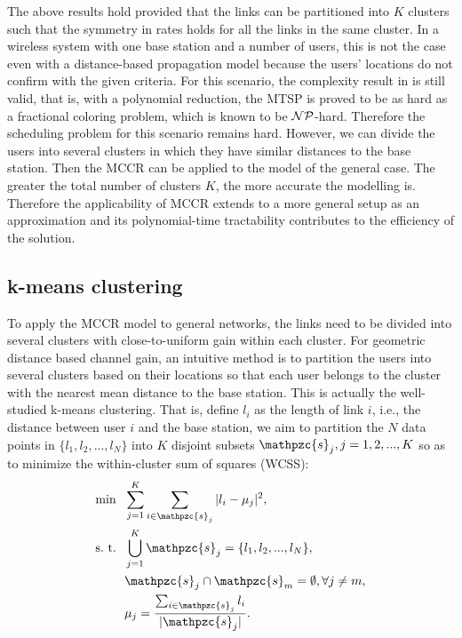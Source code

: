 \documentclass[10pt,onecolumn,journal,draftcls,oneside]{IEEEtran}
\newcounter{rema}
\newcommand{\Cs}{\mathpzc{s}}
\begin{document}
The above results hold provided that the links can be partitioned into $K$ clusters such that the symmetry in rates holds for all the links in the same cluster. In a wireless system with one base station and a number of users, this is not the case even with a distance-based propagation model because the users' locations do not confirm with the given criteria.
For this scenario, the complexity result in \cite{j12} is still valid, that is, with a polynomial reduction, the MTSP is proved to be as hard as a fractional coloring problem, which is known to be ${\cal NP}$-hard. Therefore the scheduling problem for this scenario remains hard. 
However, we can divide the users into several clusters in which they have similar distances to the base station. Then the MCCR can be applied to the model of the general case. The greater the total number of clusters $K$, the more accurate the modelling is. Therefore the applicability of MCCR extends to a more general setup as an approximation and its polynomial-time tractability contributes to the efficiency of the solution.

\subsection{k-means clustering}
To apply the MCCR model to general networks, the links need to be divided into several clusters with close-to-uniform gain within each cluster. For geometric distance based channel gain, an intuitive method is to partition the users into several clusters based on their locations so that each user belongs to the cluster with the nearest mean distance to the base station. This is actually the well-studied k-means clustering. That is, define $l_i$ as the length of link $i$, i.e., the distance between user $i$ and the base station, we aim to partition the $N$ data points in $\{l_1, l_2, ..., l_N\}$ into $K$ disjoint subsets $\Cs_j, j = 1, 2, ..., K$ so as to minimize the within-cluster sum of squares (WCSS):
\begin{subequations}
\label{eq:kmeans}
\begin{align}
\min~~ & \sum_{j=1}^K {\sum_{i \in \Cs_j}|l_i - \mu_j|^2},\\
\text{s.~t.}~~& \bigcup_{j=1}^K \Cs_j = \{l_1, l_2, ..., l_N\},\\
& \Cs_j \cap \Cs_m = \emptyset, \forall j \neq m,\\
& \mu_j = \frac {\sum_{i \in \Cs_j}l_i}{|\Cs_j|}.
\end{align}
\end{subequations}
\end{document}
